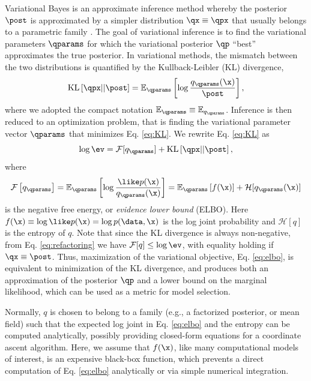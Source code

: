 Variational Bayes is an approximate inference method whereby the posterior $\post$ is approximated by a simpler distribution $\qx \equiv \qpx$ that usually belongs to a parametric family \cite{jordan1999introduction,bishop2006pattern}. The goal of variational inference is to find the variational parameters $\qparams$ for which the variational posterior $\qp$ ``best'' approximates the true posterior. In variational methods, the mismatch between the two distributions is quantified by the Kullback-Leibler (KL) divergence,
\begin{equation} \label{eq:KL}
\text{KL}\left[\qpx || \post\right] = \mathbb{E}_{\qparams} \left[\log \frac{q_{\qparams}(\x)}{\post} \right],
\end{equation}
where we adopted the compact notation $\mathbb{E}_{\qparams} \equiv \mathbb{E}_{q_{\qparams}}$.
Inference is then reduced to an optimization problem, that is finding the variational parameter vector $\qparams$ that minimizes Eq. \ref{eq:KL}. %
We rewrite Eq. \ref{eq:KL} as
\begin{equation} \label{eq:refactoring}
\log \ev = \mathcal{F}[q_{\qparams}] + \text{KL}\left[\qpx || \post\right],
\end{equation}
where
\begin{equation} \label{eq:elbo}
\mathcal{F}\left[ q_{\qparams} \right] =  \mathbb{E}_{\qparams} \left[\log \frac{\like p(\x)}{q_{\qparams}(\x)} \right] = \mathbb{E}_{\qparams} \left[f(\x) \right] + \mathcal{H}[q_{\qparams}(\x)] 
\end{equation}
is the negative free energy, or \emph{evidence lower bound} (ELBO). Here $f(\x) \equiv \log \like p(\x) = \log p(\data, \x)$ is the log joint probability and $\mathcal{H}[q]$ is the entropy of $q$. Note that since the KL divergence is always non-negative, from Eq. \ref{eq:refactoring} we have $\mathcal{F}[q] \le \log \ev$, with equality holding if $\qx \equiv \post$. Thus, maximization of the variational objective, Eq. \ref{eq:elbo}, is equivalent to minimization of the KL divergence, and produces both an approximation of the posterior $\qp$ and a lower bound on the marginal likelihood, which can be used as a metric for model selection.

Normally, $q$ is chosen to belong to a family (e.g., a factorized posterior, or mean field) such that the expected log joint in Eq. \ref{eq:elbo} and the entropy can be computed analytically, possibly providing closed-form equations for a coordinate ascent algorithm. Here, we assume that $f(\x)$, like many computational models of interest, is an expensive black-box function, which prevents a direct computation of Eq. \ref{eq:elbo} analytically or via simple numerical integration.

